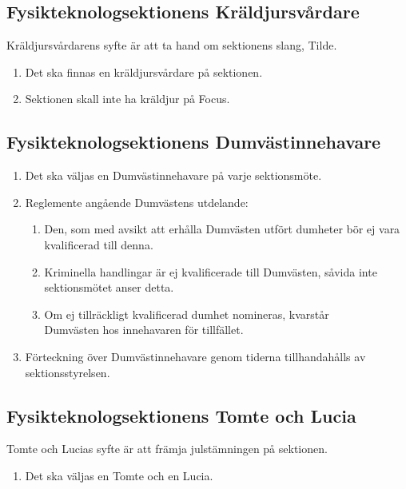 \documentclass[11pt,a4paper]{article}
\begin{document}
\subsection{Fysikteknologsektionens Kräldjursvårdare}
Kräldjursvårdarens syfte är att ta hand om sektionens slang, Tilde.
\begin{enumerate}[\thesubsection .1]

  \item Det ska finnas en kräldjursvårdare på sektionen.

  \item Sektionen skall inte ha kräldjur på Focus.

\end{enumerate}

\subsection{Fysikteknologsektionens Dumvästinnehavare}

\begin{enumerate}[\thesubsection .1]

  \item Det ska väljas en Dumvästinnehavare på varje sektionsmöte.

  \item Reglemente angående Dumvästens utdelande:
    \begin{enumerate}
      \item Den, som med avsikt att erhålla Dumvästen utfört dumheter
      bör ej vara kvalificerad till denna.
      \item Kriminella handlingar är ej kvalificerade till Dumvästen,
      såvida inte sektionsmötet anser detta.
      \item Om ej tillräckligt kvalificerad dumhet nomineras, kvarstår\\
      Dum\-väst\-en hos innehavaren för tillfället.
    \end{enumerate}

  \item Förteckning över Dumvästinnehavare genom tiderna tillhandahålls av sektionsstyrelsen.

\end{enumerate}

\subsection{Fysikteknologsektionens Tomte och Lucia}
Tomte och Lucias syfte är att främja julstämningen på sektionen.
\begin{enumerate}[\thesubsection .1]

  \item Det ska väljas en Tomte och en Lucia.

\end{enumerate}
\end{document}
